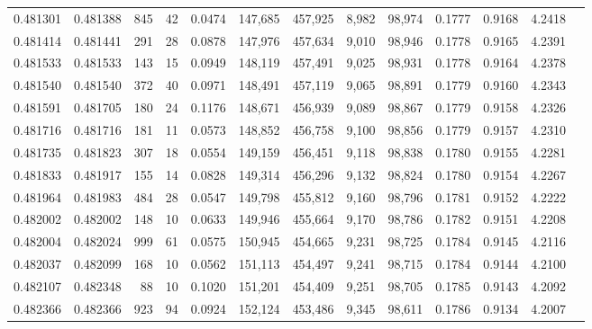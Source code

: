 \begin{tabular}{rrrrrrrrrrrrr}
0.481301 & 0.481388 &   845 &    42 &                                     0.0474 & 147,685 & 457,925 &   8,982 &  98,974 & 0.1777 & 0.9168 & 4.2418 \\
0.481414 & 0.481441 &   291 &    28 &                                     0.0878 & 147,976 & 457,634 &   9,010 &  98,946 & 0.1778 & 0.9165 & 4.2391 \\
0.481533 & 0.481533 &   143 &    15 &                                     0.0949 & 148,119 & 457,491 &   9,025 &  98,931 & 0.1778 & 0.9164 & 4.2378 \\
0.481540 & 0.481540 &   372 &    40 &                                     0.0971 & 148,491 & 457,119 &   9,065 &  98,891 & 0.1779 & 0.9160 & 4.2343 \\
0.481591 & 0.481705 &   180 &    24 &                                     0.1176 & 148,671 & 456,939 &   9,089 &  98,867 & 0.1779 & 0.9158 & 4.2326 \\
0.481716 & 0.481716 &   181 &    11 &                                     0.0573 & 148,852 & 456,758 &   9,100 &  98,856 & 0.1779 & 0.9157 & 4.2310 \\
0.481735 & 0.481823 &   307 &    18 &                                     0.0554 & 149,159 & 456,451 &   9,118 &  98,838 & 0.1780 & 0.9155 & 4.2281 \\
0.481833 & 0.481917 &   155 &    14 &                                     0.0828 & 149,314 & 456,296 &   9,132 &  98,824 & 0.1780 & 0.9154 & 4.2267 \\
0.481964 & 0.481983 &   484 &    28 &                                     0.0547 & 149,798 & 455,812 &   9,160 &  98,796 & 0.1781 & 0.9152 & 4.2222 \\
0.482002 & 0.482002 &   148 &    10 &                                     0.0633 & 149,946 & 455,664 &   9,170 &  98,786 & 0.1782 & 0.9151 & 4.2208 \\
0.482004 & 0.482024 &   999 &    61 &                                     0.0575 & 150,945 & 454,665 &   9,231 &  98,725 & 0.1784 & 0.9145 & 4.2116 \\
0.482037 & 0.482099 &   168 &    10 &                                     0.0562 & 151,113 & 454,497 &   9,241 &  98,715 & 0.1784 & 0.9144 & 4.2100 \\
0.482107 & 0.482348 &    88 &    10 &                                     0.1020 & 151,201 & 454,409 &   9,251 &  98,705 & 0.1785 & 0.9143 & 4.2092 \\
0.482366 & 0.482366 &   923 &    94 &                                     0.0924 & 152,124 & 453,486 &   9,345 &  98,611 & 0.1786 & 0.9134 & 4.2007 \\

\end{tabular}
